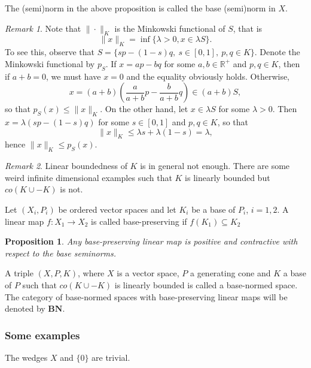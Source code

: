 \documentclass[12pt]{article}
\newtheorem{prop}{Proposition}
\theoremstyle{remark}
\newtheorem{rem}{Remark}
\newcommand{\<}{\langle}
\newcommand{\ct}[1]{\mathbf{#1}}
\begin{document}
The (semi)norm in the above proposition  is called  the base (semi)norm in $X$. 

\begin{rem}\label{rem:minkowski}
Note that $\|\cdot\|_K$ is the Minkowski functional of $S$, that is
\[
\|x\|_K= \inf\{\lambda>0, x\in \lambda S\}.
\]
To see this, observe that $S=\{s p-(1-s)q,\ s\in [0,1],\ p,q\in K\}$. Denote the Minkowski functional by $p_S$. If $x=ap-bq$ for some $a,b\in \mathbb R^+$ and $p,q\in K$, then if $a+b=0$, we must have 
$x=0$ and the equality obviously holds. Otherwise, 
\[
x= (a+b)(\frac a{a+b} p-\frac b{a+b} q)\in (a+b) S,
\]
so that $p_S(x)\le \|x\|_K$. On the other hand, let $x\in \lambda S$ for some $\lambda>0$. Then $x=\lambda(sp-(1-s)q)$ for some $s\in [0,1]$ and $p,q\in K$, so that 
\[
\|x\|_K\le \lambda s+\lambda(1-s)=\lambda,
\]
hence $\|x\|_K\le p_S(x)$.   
\end{rem}




\begin{rem} Linear boundedness of $K$ is in general not enough. There are some weird infinite dimensional examples such that $K$ is linearly bounded but $co(K\cup -K)$ is not.

\end{rem}

Let $(X_i,P_i)$ be ordered vector spaces and let $K_i$ be a base of $P_i$, $i=1,2$.  A linear map $f:X_1\to X_2$ is called base-preserving if $f(K_1)\subseteq K_2$

\begin{prop}  
 Any base-preserving linear  map  is  positive and contractive with respect to the base seminorms.
\end{prop}

A triple $(X,P,K)$, where $X$ is a vector space, $P$ a generating cone and $K$ a base of $P$ such that $co(K\cup-K)$ is linearly bounded is called a base-normed space. 
The category of base-normed spaces with base-preserving linear maps will be denoted by $\ct{BN}$.

\subsubsection*{Some examples}

The wedges $X$ and $\{0\}$ are trivial.
\end{document}
